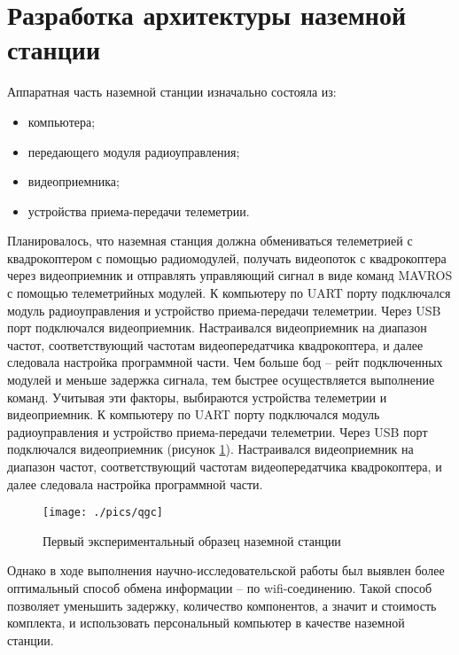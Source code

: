 \section{Разработка архитектуры наземной станции}

Аппаратная часть наземной станции изначально состояла из:
\begin{itemize}
	\item компьютера;
	\item передающего модуля радиоуправления;
	\item видеоприемника;
	\item устройства приема-передачи телеметрии.
\end{itemize}
Планировалось, что наземная станция должна обмениваться телеметрией с квадрокоптером с помощью радиомодулей, получать видеопоток с квадрокоптера через видеоприемник и отправлять управляющий сигнал в виде команд MAVROS с помощью телеметрийных модулей. 
К компьютеру по UART порту подключался модуль радиоуправления и устройство приема-передачи телеметрии. Через USB порт подключался видеоприемник. Настраивался видеоприемник на диапазон частот, соответствующий частотам видеопередатчика квадрокоптера, и далее следовала настройка программной части.
Чем больше бод -- рейт подключенных модулей и меньше задержка сигнала, тем быстрее осуществляется выполнение команд. Учитывая эти факторы, выбираются устройства телеметрии и видеоприемник.
К компьютеру по UART порту подключался модуль радиоуправления и устройство приема-передачи телеметрии. Через USB порт подключался видеоприемник (рисунок \ref{fig:ns}). Настраивался видеоприемник на диапазон частот, соответствующий частотам видеопередатчика квадрокоптера, и далее следовала настройка программной части.
\begin{figure}[H]
	\centering
	\texttt{[image: ./pics/qgc]}
	\caption{Первый экспериментальный образец наземной станции
	}
	\label{fig:ns} %
\end{figure}

Однако в ходе выполнения научно-исследовательской работы \cite{nir3} был выявлен более оптимальный способ обмена информации -- по wifi-соединению. Такой способ позволяет уменьшить задержку, количество компонентов, а значит и стоимость комплекта, и использовать персональный компьютер в качестве наземной станции.

